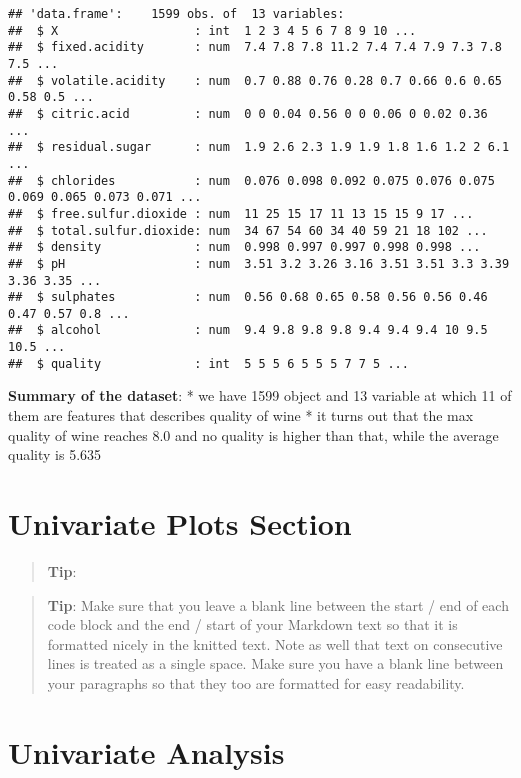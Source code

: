 \documentclass[]{article}
\begin{document}
\begin{verbatim}
## 'data.frame':    1599 obs. of  13 variables:
##  $ X                   : int  1 2 3 4 5 6 7 8 9 10 ...
##  $ fixed.acidity       : num  7.4 7.8 7.8 11.2 7.4 7.4 7.9 7.3 7.8 7.5 ...
##  $ volatile.acidity    : num  0.7 0.88 0.76 0.28 0.7 0.66 0.6 0.65 0.58 0.5 ...
##  $ citric.acid         : num  0 0 0.04 0.56 0 0 0.06 0 0.02 0.36 ...
##  $ residual.sugar      : num  1.9 2.6 2.3 1.9 1.9 1.8 1.6 1.2 2 6.1 ...
##  $ chlorides           : num  0.076 0.098 0.092 0.075 0.076 0.075 0.069 0.065 0.073 0.071 ...
##  $ free.sulfur.dioxide : num  11 25 15 17 11 13 15 15 9 17 ...
##  $ total.sulfur.dioxide: num  34 67 54 60 34 40 59 21 18 102 ...
##  $ density             : num  0.998 0.997 0.997 0.998 0.998 ...
##  $ pH                  : num  3.51 3.2 3.26 3.16 3.51 3.51 3.3 3.39 3.36 3.35 ...
##  $ sulphates           : num  0.56 0.68 0.65 0.58 0.56 0.56 0.46 0.47 0.57 0.8 ...
##  $ alcohol             : num  9.4 9.8 9.8 9.8 9.4 9.4 9.4 10 9.5 10.5 ...
##  $ quality             : int  5 5 5 6 5 5 5 7 7 5 ...
\end{verbatim}

\textbf{Summary of the dataset}: * we have 1599 object and 13 variable
at which 11 of them are features that describes quality of wine * it
turns out that the max quality of wine reaches 8.0 and no quality is
higher than that, while the average quality is 5.635

\section{Univariate Plots Section}\label{univariate-plots-section}

\begin{quote}
\textbf{Tip}:
\end{quote}

\begin{quote}
\textbf{Tip}: Make sure that you leave a blank line between the start /
end of each code block and the end / start of your Markdown text so that
it is formatted nicely in the knitted text. Note as well that text on
consecutive lines is treated as a single space. Make sure you have a
blank line between your paragraphs so that they too are formatted for
easy readability.
\end{quote}

\section{Univariate Analysis}\label{univariate-analysis}
\end{document}
